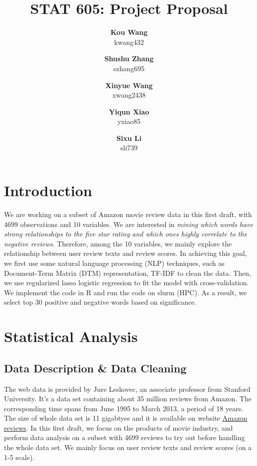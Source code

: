 \documentclass[12pt]{article}
\title{\textbf{STAT 605: Project Proposal}}
\author{\textbf{Kou Wang} \\ kwang432  \\ \and  \textbf{Shushu Zhang} \\ szhang695 \and \textbf{Xinyue Wang} \\ xwang2438 \and \textbf{Yiqun Xiao} \\ yxiao85 \and \textbf{Sixu Li} \\ sli739}
\date{}
\begin{document}
	\maketitle
	
\section{Introduction}
We are working on a subset of Amazon movie review data in this first draft, with 4699 observations and 10 variables. We are interested in \textit{mining which words have strong relationships to the five star rating and which ones highly correlate to the negative reviews.} Therefore, among the 10 variables, we mainly explore the relationship between user review texts and review scores. In achieving this goal, we first use some natural language processing (NLP) techniques, such as Document-Term Matrix (DTM) representation, TF-IDF to clean the data. Then, we use regularized lasso logistic regression to fit the model with cross-validation. We implement the code in R and run the code on slurm (HPC). As a result, we select top 30 positive and negative words based on significance. 
 
\section{Statistical Analysis}
\label{sec:2}

\subsection{Data Description \& Data Cleaning}
\label{subsec:Cleaning}
The web data is provided by Jure Leskovec, an associate professor from Stanford University. It's a data set containing about 35 million reviews from Amazon. The corresponding time spans from June 1995 to March 2013, a period of 18 years. The size of whole data set is 11 gigabtyes and it is available on website \href{http://snap.stanford.edu/data/web-Amazon-links.html}{Amazon reviews}. In this first draft, we focus on the products of movie industry, and perform data analysis on a subset with 4699 reviews to try out before handling the whole data set. We mainly focus on user review texts and review scores (on a 1-5 scale).
\end{document}
